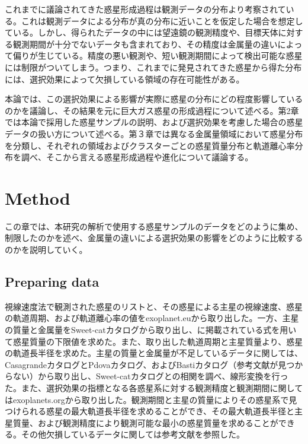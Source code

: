\documentclass[twocolumn, dvipdfmx]{aastex62}
\begin{document}
\begin{CJK*}{UTF8}{min}
これまでに議論されてきた惑星形成過程は観測データの分布より考察されている。これは観測データによる分布が真の分布に近いことを仮定した場合を想定している。しかし、得られたデータの中には望遠鏡の観測精度や、目標天体に対する観測期間が十分でないデータも含まれており、その精度は金属量の違いによって偏りが生じている。精度の悪い観測や、短い観測期間によって検出可能な惑星には制限がついてしまう。つまり、これまでに発見されてきた惑星から得た分布には、選択効果によって欠損している領域の存在可能性がある。

本論では、この選択効果による影響が実際に惑星の分布にどの程度影響しているのかを議論し、その結果を元に巨大ガス惑星の形成過程について述べる。第2章では本論で採用した惑星サンプルの説明、および選択効果を考慮した場合の惑星データの扱い方について述べる。第３章では異なる金属量領域において惑星分布を分類し、それぞれの領域およびクラスターごとの惑星質量分布と軌道離心率分布を調べ、そこから言える惑星形成過程や進化について議論する。


\section{Method} \label{sec:method}

この章では、本研究の解析で使用する惑星サンプルのデータをどのように集め、制限したのかを述べ、金属量の違いによる選択効果の影響をどのように比較するのかを説明していく。


\subsection{Preparing data} \label{subsec:prepare}

視線速度法で観測された惑星のリストと、その惑星による主星の視線速度、惑星の軌道周期、および軌道離心率の値をexoplanet.euから取り出した。一方、主星の質量と金属量をSweet-catカタログから取り出し、\cite{2008ApJ...677.1324T}に掲載されている式を用いて惑星質量の下限値を求めた。また、取り出した軌道周期と主星質量より、惑星の軌道長半径を求めた。主星の質量と金属量が不足しているデータに関しては、Casagrandeカタログ\citep{2011A&A...530A.138C}とPdovaカタログ\citep{2011MNRAS.416..727C}、およびBastiカタログ（参考文献が見つからない）から取り出し、Sweet-catカタログとの相関を調べ、線形変換を行った。また、選択効果の指標となる各惑星系に対する観測精度と観測期間に関してはexoplanets.orgから取り出した。観測期間と主星の質量によりその惑星系で見つけられる惑星の最大軌道長半径を求めることができ、その最大軌道長半径と主星質量、および観測精度により観測可能な最小の惑星質量を求めることができる。その他欠損しているデータに関しては参考文献を参照した。


\end{CJK*}
\end{document}
